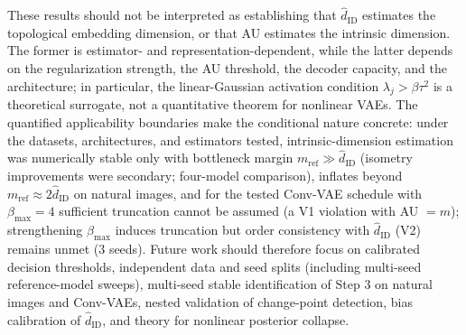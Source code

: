 \documentclass[make,article,submit,pdftex,moreauthors]{Definitions/mdpi}
\newcommand{\hatdID}{\hat{d}_{\mathrm{ID}}}
\begin{document}
These results should not be interpreted as establishing that $\hatdID$
estimates the topological embedding dimension, or that AU estimates the
intrinsic dimension.
The former is estimator- and representation-dependent, while the latter
depends on the regularization strength, the AU threshold, the decoder
capacity, and the architecture; in particular, the linear-Gaussian
activation condition $\lambda_j > \beta\tau^2$ is a theoretical surrogate,
not a quantitative theorem for nonlinear VAEs.
The quantified applicability boundaries make the conditional nature
concrete: under the datasets, architectures, and estimators tested,
intrinsic-dimension estimation was numerically stable only with bottleneck
margin $m_{\mathrm{ref}} \gg \hatdID$ (isometry improvements were
secondary; four-model comparison), inflates beyond
$m_{\mathrm{ref}} \approx 2\hatdID$ on natural images, and for the tested
Conv-VAE schedule with $\beta_{\max} = 4$
sufficient truncation cannot be assumed (a V1
violation with AU $= m$); strengthening $\beta_{\max}$ induces truncation
but order consistency with $\hatdID$ (V2) remains unmet (3 seeds).
Future work should therefore focus on calibrated decision thresholds,
independent data and seed splits (including multi-seed reference-model
sweeps), multi-seed stable identification of Step 3 on natural images and
Conv-VAEs, nested validation of change-point detection, bias calibration
of $\hatdID$, and theory for nonlinear posterior collapse.



\end{document}
